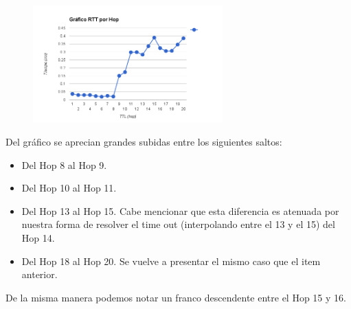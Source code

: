 \begin{figure}[h]
    \includegraphics[width=0.65\textwidth]{img_analisis1/rtt_hop.png}
    
\end{figure}
\vspace{0.25cm}

Del gr\'afico se aprecian grandes subidas entre los siguientes saltos:
\begin{itemize}
\item Del Hop 8 al Hop 9.
\item Del Hop 10 al Hop 11.
\item Del Hop 13 al Hop 15. Cabe mencionar que esta diferencia es atenuada por nuestra forma de resolver el time out (interpolando entre el 13 y el 15) del Hop 14.
\item Del Hop 18 al Hop 20. Se vuelve a presentar el mismo caso que el item anterior.
\end{itemize}
De la misma manera podemos notar un franco descendente entre el Hop 15 y 16.

